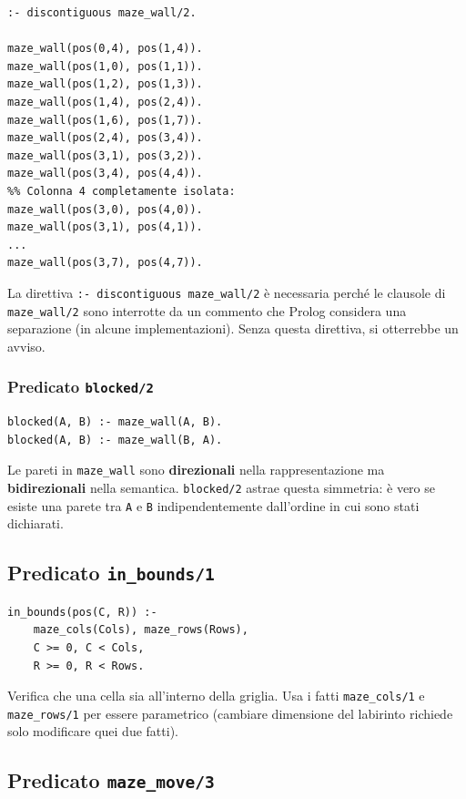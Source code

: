 \documentclass[12pt,a4paper]{article}
\begin{document}
\begin{lstlisting}
:- discontiguous maze_wall/2.

maze_wall(pos(0,4), pos(1,4)).
maze_wall(pos(1,0), pos(1,1)).
maze_wall(pos(1,2), pos(1,3)).
maze_wall(pos(1,4), pos(2,4)).
maze_wall(pos(1,6), pos(1,7)).
maze_wall(pos(2,4), pos(3,4)).
maze_wall(pos(3,1), pos(3,2)).
maze_wall(pos(3,4), pos(4,4)).
%% Colonna 4 completamente isolata:
maze_wall(pos(3,0), pos(4,0)).
maze_wall(pos(3,1), pos(4,1)).
...
maze_wall(pos(3,7), pos(4,7)).
\end{lstlisting}

La direttiva \texttt{:- discontiguous maze\_wall/2} è necessaria perché le
clausole di \texttt{maze\_wall/2} sono interrotte da un commento che Prolog
considera una separazione (in alcune implementazioni). Senza questa direttiva,
si otterrebbe un avviso.

\subsubsection{Predicato \texttt{blocked/2}}

\begin{lstlisting}
blocked(A, B) :- maze_wall(A, B).
blocked(A, B) :- maze_wall(B, A).
\end{lstlisting}

Le pareti in \texttt{maze\_wall} sono \textbf{direzionali} nella rappresentazione
ma \textbf{bidirezionali} nella semantica. \texttt{blocked/2} astrae questa
simmetria: è vero se esiste una parete tra \texttt{A} e \texttt{B}
indipendentemente dall'ordine in cui sono stati dichiarati.

\subsection{Predicato \texttt{in\_bounds/1}}

\begin{lstlisting}
in_bounds(pos(C, R)) :-
    maze_cols(Cols), maze_rows(Rows),
    C >= 0, C < Cols,
    R >= 0, R < Rows.
\end{lstlisting}

Verifica che una cella sia all'interno della griglia. Usa i fatti
\texttt{maze\_cols/1} e \texttt{maze\_rows/1} per essere parametrico
(cambiare dimensione del labirinto richiede solo modificare quei due fatti).

\subsection{Predicato \texttt{maze\_move/3}}
\end{document}
